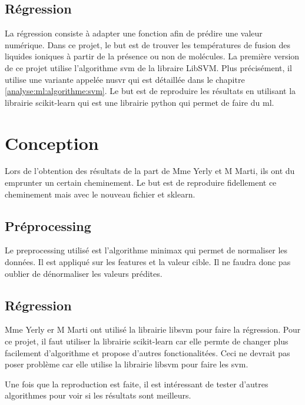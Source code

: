 \subsection{Régression}
La régression consiste à adapter une fonction afin de prédire une valeur numérique.
Dans ce projet, le but est de trouver les températures de fusion des liquides ioniques à partir de la présence ou non de molécules.
La première version de ce projet utilise l'algorithme \acrfull{svm} de la libraire LibSVM\cite{libsvm_doc}.
Plus précisément, il utilise une variante appelée \acrshort{nusvr} qui est détaillée dans le chapitre \ref{analyse:ml:algorithme:svm}.
Le but est de reproduire les résultats en utilisant la librairie scikit-learn\cite{scikit-learn} qui est une librairie python qui permet de faire du \acrlong{ml}.


\section{Conception}
Lors de l'obtention des résultats de la part de Mme Yerly et M Marti, ils ont du emprunter un certain cheminement.
Le but est de reproduire fidellement ce cheminement mais avec le nouveau fichier\cite{New_data} et \acrlong{sklearn}\cite{scikit-learn}.

\subsection{Préprocessing}
Le preprocessing utilisé est l'algorithme \acrshort{minimax} qui permet de normaliser les données.
Il est appliqué sur les features et la valeur cible.
Il ne faudra donc pas oublier de dénormaliser les valeurs prédites.

\subsection{Régression}
\label{sec:conception_regression}
Mme Yerly er M Marti ont utilisé la librairie libsvm\cite{libsvm_doc} pour faire la régression.
Pour ce projet, il faut utiliser la librairie scikit-learn\cite{scikit-learn} car elle permte de changer plus facilement d'algorithme et propose d'autres fonctionalitées.
Ceci ne devrait pas poser problème car elle utilise la librairie libsvm\cite{libsvm_doc} pour faire les \acrlong{svm}.

Une fois que la reproduction est faite, il est intéressant de tester d'autres algorithmes pour voir si les résultats sont meilleurs.

